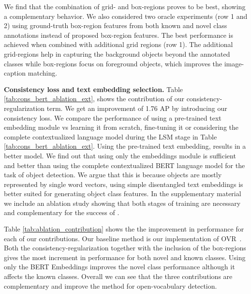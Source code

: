We find that the combination of grid- and box-regions proves to be best, showing a complementary behavior. 
We also considered two oracle experiments (row 1 and 2) using ground-truth box-region features from both known and novel class annotations instead of proposed box-region features.
The best performance is achieved when combined with additional grid regions (row 1). The additional grid-regions help in capturing the background objects beyond the annotated classes while box-regions focus on foreground objects, which improves the image-caption matching.









\textbf{Consistency loss and text embedding selection.} Table \ref{tab:cons_bert_ablation_ext}, shows the contribution of our consistency-regularization term. We get an improvement of 1.76 AP by introducing our consistency loss.
We compare the performance of using a pre-trained text embedding module vs learning it from scratch, fine-tuning it or considering the complete contextualized language model during the LSM stage in Table \ref{tab:cons_bert_ablation_ext}. Using the pre-trained text embedding, results in a better model.
We find out that using only the embeddings module is sufficient and better than using the complete contextualized BERT language model for the task of object detection. We argue that this is because objects are mostly represented by single word vectors, using simple disentangled text embeddings is better suited for generating object class features. In the supplementary material we include an ablation study showing that both stages of training are necessary and complementary for the success of \modelname. 



Table \ref{tab:ablation_contribution} shows the the improvement in performance for each of our contributions. Our baseline method is our implementation of OVR~\cite{zareian2021open}. Both the consistency-regularization together with the inclusion of the box-regions gives the most increment in performance for both novel and known classes. Using only the BERT Embeddings improves the novel class performance although it affects the known classes. Overall we can see that the three contributions are complementary and improve the method for open-vocabulary detection.



